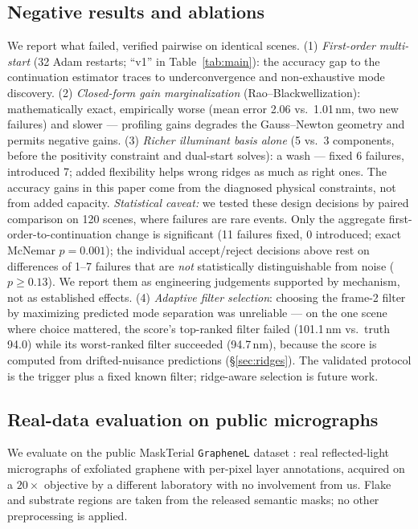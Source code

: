 \documentclass[10pt]{article}
\begin{document}
\subsection{Negative results and ablations}\label{sec:negative}
We report what failed, verified pairwise on identical scenes. (1) \emph{First-order multi-start} (32 Adam \cite{kingma2015} restarts; ``v1'' in Table~\ref{tab:main}): the accuracy gap to the continuation estimator traces to underconvergence and non-exhaustive mode discovery. (2) \emph{Closed-form gain marginalization} (Rao--Blackwellization): mathematically exact, empirically worse (mean error 2.06 vs.\ 1.01\,nm, two new failures) and slower --- profiling gains degrades the Gauss--Newton geometry and permits negative gains. (3) \emph{Richer illuminant basis alone} (5 vs.\ 3 components, before the positivity constraint and dual-start solves): a wash --- fixed 6 failures, introduced 7; added flexibility helps wrong ridges as much as right ones. The accuracy gains in this paper come from the diagnosed physical constraints, not from added capacity. \emph{Statistical caveat:} we tested these design decisions by paired comparison on 120 scenes, where failures are rare events. Only the aggregate first-order-to-continuation change is significant (11 failures fixed, 0 introduced; exact McNemar $p{=}0.001$); the individual accept/reject decisions above rest on differences of 1--7 failures that are \emph{not} statistically distinguishable from noise ($p\ge0.13$). We report them as engineering judgements supported by mechanism, not as established effects. (4) \emph{Adaptive filter selection}: choosing the frame-2 filter by maximizing predicted mode separation was unreliable --- on the one scene where choice mattered, the score's top-ranked filter failed (101.1\,nm vs.\ truth 94.0) while its worst-ranked filter succeeded (94.7\,nm), because the score is computed from drifted-nuisance predictions (\S\ref{sec:ridges}). The validated protocol is the trigger plus a fixed known filter; ridge-aware selection is future work.

\subsection{Real-data evaluation on public micrographs}\label{sec:real}
We evaluate on the public MaskTerial \texttt{GrapheneL} dataset \cite{uslu2024maskterial}: real reflected-light micrographs of exfoliated graphene with per-pixel layer annotations, acquired on a $20\times$ objective by a different laboratory with no involvement from us. Flake and substrate regions are taken from the released semantic masks; no other preprocessing is applied.
\end{document}
